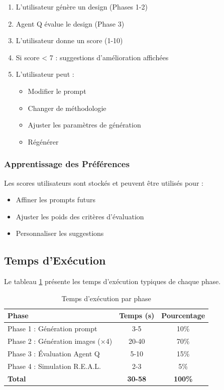 \begin{enumerate}[leftmargin=*]
    \item L'utilisateur génère un design (Phases 1-2)
    \item Agent Q évalue le design (Phase 3)
    \item L'utilisateur donne un score (1-10)
    \item Si score < 7 : suggestions d'amélioration affichées
    \item L'utilisateur peut :
    \begin{itemize}
        \item Modifier le prompt
        \item Changer de méthodologie
        \item Ajuster les paramètres de génération
        \item Régénérer
    \end{itemize}
\end{enumerate}

\subsubsection{Apprentissage des Préférences}

Les scores utilisateurs sont stockés et peuvent être utilisés pour :
\begin{itemize}[leftmargin=*]
    \item Affiner les prompts futurs
    \item Ajuster les poids des critères d'évaluation
    \item Personnaliser les suggestions
\end{itemize}

\subsection{Temps d'Exécution}

Le tableau \ref{tab:execution_times} présente les temps d'exécution typiques de chaque phase.

\begin{table}[H]
\centering
\caption{Temps d'exécution par phase}
\label{tab:execution_times}
\begin{tabular}{@{}lcc@{}}
\toprule
\textbf{Phase} & \textbf{Temps (s)} & \textbf{Pourcentage} \\ 
\midrule
Phase 1 : Génération prompt & 3-5 & 10\% \\
Phase 2 : Génération images (×4) & 20-40 & 70\% \\
Phase 3 : Évaluation Agent Q & 5-10 & 15\% \\
Phase 4 : Simulation R.E.A.L. & 2-3 & 5\% \\
\midrule
\textbf{Total} & \textbf{30-58} & \textbf{100\%} \\
\bottomrule
\end{tabular}
\end{table}

